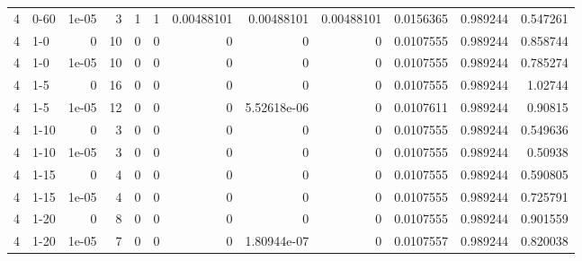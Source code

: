 \begin{tabular}{rlrrrrrrrrrr}
     4 & 0-60   &      1e-05 &           3 &                 1 &                 1 &     0.00488101  &     0.00488101  &      0.00488101  &        0.0156365 &               0.989244 &           0.547261 \\
     4 & 1-0    &      0     &          10 &                 0 &                 0 &     0           &     0           &      0           &        0.0107555 &               0.989244 &           0.858744 \\
     4 & 1-0    &      1e-05 &          10 &                 0 &                 0 &     0           &     0           &      0           &        0.0107555 &               0.989244 &           0.785274 \\
     4 & 1-5    &      0     &          16 &                 0 &                 0 &     0           &     0           &      0           &        0.0107555 &               0.989244 &           1.02744  \\
     4 & 1-5    &      1e-05 &          12 &                 0 &                 0 &     0           &     5.52618e-06 &      0           &        0.0107611 &               0.989244 &           0.90815  \\
     4 & 1-10   &      0     &           3 &                 0 &                 0 &     0           &     0           &      0           &        0.0107555 &               0.989244 &           0.549636 \\
     4 & 1-10   &      1e-05 &           3 &                 0 &                 0 &     0           &     0           &      0           &        0.0107555 &               0.989244 &           0.50938  \\
     4 & 1-15   &      0     &           4 &                 0 &                 0 &     0           &     0           &      0           &        0.0107555 &               0.989244 &           0.590805 \\
     4 & 1-15   &      1e-05 &           4 &                 0 &                 0 &     0           &     0           &      0           &        0.0107555 &               0.989244 &           0.725791 \\
     4 & 1-20   &      0     &           8 &                 0 &                 0 &     0           &     0           &      0           &        0.0107555 &               0.989244 &           0.901559 \\
     4 & 1-20   &      1e-05 &           7 &                 0 &                 0 &     0           &     1.80944e-07 &      0           &        0.0107557 &               0.989244 &           0.820038 \\

\end{tabular}
